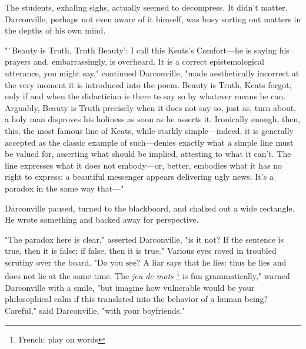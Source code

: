   The students, exhaling sighs, actually seemed to decompress. It didn't matter.
Darconville, perhaps not even aware of it himself, was busy sorting out matters
in the depths of his own mind.

  "`Beauty is Truth, Truth Beauty': I call this Keats's Comfort---he is saying
his prayers and, embarrassingly, is overheard. It is a correct epistemological
utterance, you might say," continued Darconville, "made aesthetically incorrect
at the very moment it is introduced into the poem. Beauty is Truth, Keats
forgot, only if and when the didactician 
is there to say so by whatever means he
can. Arguably, Beauty is Truth precisely when it does not say so, just as, turn
about, a holy man disproves his holiness as soon as he asserts it. Ironically
enough, then, this, the most famous line of Keats, while starkly simple---indeed,
it is generally accepted as the classic example of such---denies exactly what a
simple line must be valued for, asserting what should be implied, attesting to
what it can't. The line expresses what it does not embody---or, better, embodies
what it has no right to express: a beautiful messenger appears delivering ugly
news. It's a paradox in the same way that---"

  Darconville paused, turned to the blackboard, and chalked out a wide
rectangle. He wrote something and backed away for perspective.
 
\begin{center}
\end{center}
 
  "The paradox here is clear," asserted Darconville, "is it not? If the sentence
is true, then it is false; if false, then it is true." Various eyes roved 
in troubled scrutiny 
over the board. "Do you see? A liar says that he lies: thus he
lies and does not lie at the same time. The \textit{jeu de mots}
\footnote{ French: play on words}
is fun grammatically,"
warned Darconville with a smile, "but imagine how vulnerable would be your
philosophical calm if this translated into the behavior of a human being?
Careful," said Darconville, "with your boyfriends."


